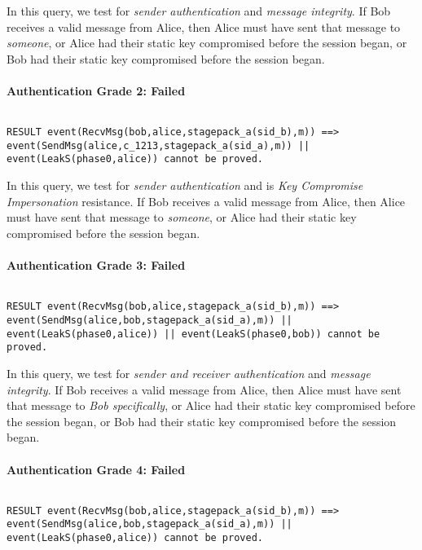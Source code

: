 In this query, we test for \emph{sender authentication} and \emph{message integrity}. If Bob receives a valid message from Alice, then Alice must have sent that message to \emph{someone}, or Alice had their static key compromised before the session began, or Bob had their static key compromised before the session began.


\paragraph{Authentication Grade 2: Failed}$ $
\begin{lstlisting}
RESULT event(RecvMsg(bob,alice,stagepack_a(sid_b),m)) ==> event(SendMsg(alice,c_1213,stagepack_a(sid_a),m)) || event(LeakS(phase0,alice)) cannot be proved.
\end{lstlisting}

In this query, we test for \emph{sender authentication} and is \emph{Key Compromise Impersonation} resistance. If Bob receives a valid message from Alice, then Alice must have sent that message to \emph{someone}, or Alice had their static key compromised before the session began.


\paragraph{Authentication Grade 3: Failed}$ $
\begin{lstlisting}
RESULT event(RecvMsg(bob,alice,stagepack_a(sid_b),m)) ==> event(SendMsg(alice,bob,stagepack_a(sid_a),m)) || event(LeakS(phase0,alice)) || event(LeakS(phase0,bob)) cannot be proved.
\end{lstlisting}

In this query, we test for \emph{sender and receiver authentication} and \emph{message integrity}. If Bob receives a valid message from Alice, then Alice must have sent that message to \emph{Bob specifically}, or Alice had their static key compromised before the session began, or Bob had their static key compromised before the session began.


\paragraph{Authentication Grade 4: Failed}$ $
\begin{lstlisting}
RESULT event(RecvMsg(bob,alice,stagepack_a(sid_b),m)) ==> event(SendMsg(alice,bob,stagepack_a(sid_a),m)) || event(LeakS(phase0,alice)) cannot be proved.
\end{lstlisting}

